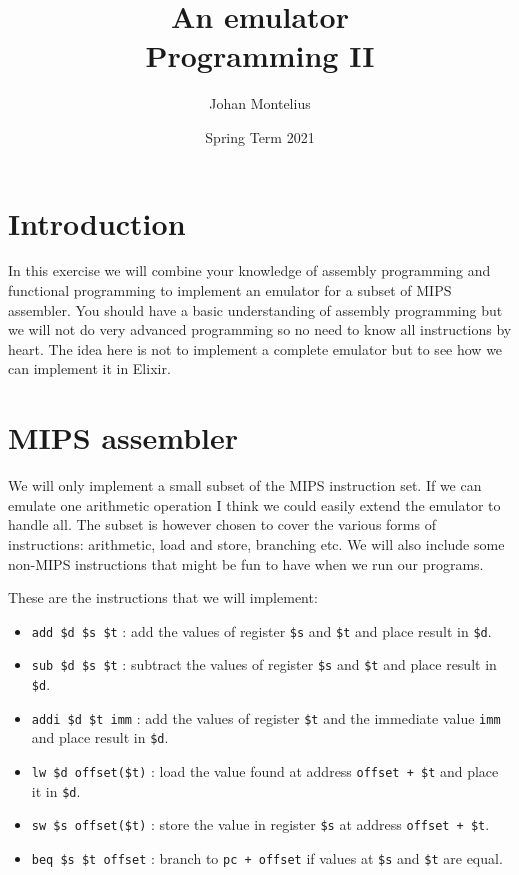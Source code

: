 \documentclass[a4paper,11pt]{article}
\begin{document}
\title{
  \textbf{An emulator}\\
  \large{Programming II}
}
\author{Johan Montelius}
\date{Spring Term 2021}
\maketitle
{}

\section*{Introduction}

In this exercise we will combine your knowledge of assembly
programming and functional programming to implement an emulator for a
subset of MIPS assembler. You should have a basic understanding of
assembly programming but we will not do very advanced programming so
no need to know all instructions by heart. The idea here is not to
implement a complete emulator but to see how we can implement it in
Elixir.


\section{MIPS assembler}

We will only implement a small subset of the MIPS instruction set. If
we can emulate one arithmetic operation I think we could easily extend
the emulator to handle all. The subset is however chosen to cover the
various forms of instructions: arithmetic, load and store, branching
etc. We will also include some non-MIPS instructions that might be fun
to have when we run our programs.


These are the instructions that we will implement:

\begin{itemize}
\item {\tt add \$d \$s \$t} : add the values of register {\tt \$s} and {\tt \$t} and place result in {\tt \$d}.
\item {\tt sub \$d \$s \$t} : subtract the values of register {\tt \$s} and {\tt \$t} and place result in {\tt \$d}.
\item {\tt addi \$d \$t imm} : add the values of register {\tt \$t} and the immediate value {\tt imm} and place result in {\tt \$d}.
\item {\tt lw \$d offset(\$t)} : load the value found at address {\tt offset + \$t} and place it in {\tt \$d}.
\item {\tt sw \$s offset(\$t)} : store the value in register {\tt \$s} at address {\tt offset + \$t}. 
\item {\tt beq \$s \$t offset} : branch to {\tt pc + offset} if values at {\tt \$s} and  {\tt \$t} are equal.
\end{itemize}
\end{document}
